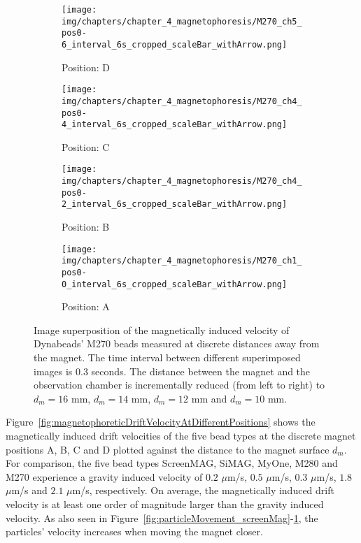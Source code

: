 \begin{figure}[htb]
	\centering
	\begin{subfigure}[b]{0.22\textwidth}
		\texttt{[image: img/chapters/chapter\_4\_magnetophoresis/M270\_ch5\_pos0-6\_interval\_6s\_cropped\_scaleBar\_withArrow.png]}
		\caption{Position: D}
	\end{subfigure}
	\hfill
	\begin{subfigure}[b]{0.22\textwidth}
		\texttt{[image: img/chapters/chapter\_4\_magnetophoresis/M270\_ch4\_pos0-4\_interval\_6s\_cropped\_scaleBar\_withArrow.png]}
		\caption{Position: C}
	\end{subfigure}
	\hfill
	\begin{subfigure}[b]{0.22\textwidth}
		\texttt{[image: img/chapters/chapter\_4\_magnetophoresis/M270\_ch4\_pos0-2\_interval\_6s\_cropped\_scaleBar\_withArrow.png]}
		\caption{Position: B}
	\end{subfigure}
	\hfill
	\begin{subfigure}[b]{0.22\textwidth}
		\texttt{[image: img/chapters/chapter\_4\_magnetophoresis/M270\_ch1\_pos0-0\_interval\_6s\_cropped\_scaleBar\_withArrow.png]}
		\caption{Position: A}
	\end{subfigure}      
	\caption[Magnetically induced velocities of Dynabeads' M270 beads at different magnetophoretic driving forces]{Image superposition of the magnetically induced velocity of Dynabeads' M270 beads measured at discrete distances away from the magnet. The time interval between different superimposed images is $0.3$ seconds. The distance between the magnet and the observation chamber is incrementally reduced (from left to right) to $d_{m}=16$ mm, $d_{m}=14$ mm, $d_{m}=12$ mm and $d_{m}=10$ mm.}
	\label{fig:particleMovement_M270}
\end{figure} 

Figure~\ref{fig:magnetophoreticDriftVelocityAtDifferentPositions} shows the magnetically induced drift velocities of the five bead types at the discrete magnet positions A, B, C and D plotted against the distance to the magnet surface $d_{m}$. For comparison, the five bead types ScreenMAG, SiMAG, MyOne, M280 and M270 experience a gravity induced velocity of $0.2$ $\mu$m/s, $0.5$ $\mu$m/s, $0.3$ $\mu$m/s, $1.8$ $\mu$m/s and $2.1$ $\mu$m/s, respectively. On average, the magnetically induced drift velocity is at least one order of magnitude larger than the gravity induced velocity. As also seen in Figure~\ref{fig:particleMovement_screenMag}-\ref{fig:particleMovement_M270}, the particles' velocity increases when moving the magnet closer.

